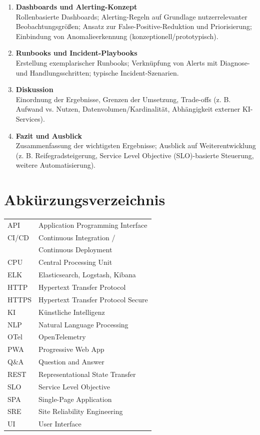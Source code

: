 \begin{enumerate}
  \item \textbf{Dashboards und Alerting-Konzept} \\
  Rollenbasierte Dashboards; Alerting-Regeln auf Grundlage nutzerrelevanter Beobachtungsgrößen; Ansatz zur False-Positive-Reduktion und Priorisierung; Einbindung von Anomalieerkennung (konzeptionell/prototypisch).

  \item \textbf{Runbooks und Incident-Playbooks} \\
  Erstellung exemplarischer Runbooks; Verknüpfung von Alerts mit Diagnose- und Handlungsschritten; typische Incident-Szenarien.

  \item \textbf{Diskussion} \\
  Einordnung der Ergebnisse, Grenzen der Umsetzung, Trade-offs (z. B.  Aufwand vs. Nutzen, Datenvolumen/Kardinalität, Abhängigkeit externer KI-Services).

  \item \textbf{Fazit und Ausblick} \\
  Zusammenfassung der wichtigsten Ergebnisse; Ausblick auf Weiterentwicklung (z. B.  Reifegradsteigerung, Service Level Objective (SLO)-basierte Steuerung, weitere Automatisierung).
\end{enumerate}



\section*{Abkürzungsverzeichnis}

\begin{tabular}{p{1.5cm} p{11cm}}
API        & Application Programming Interface \\
CI/CD      & Continuous Integration /\\
           & Continuous Deployment \\
CPU        & Central Processing Unit \\
ELK        & Elasticsearch, Logstash, Kibana \\
HTTP       & Hypertext Transfer Protocol \\
HTTPS     & Hypertext Transfer Protocol Secure \\
KI         & Künstliche Intelligenz \\
NLP        & Natural Language Processing \\
OTel      & OpenTelemetry \\
PWA       & Progressive Web App \\
Q\&A      & Question and Answer \\
REST      & Representational State Transfer \\
SLO       & Service Level Objective \\
SPA       & Single-Page Application \\
SRE       & Site Reliability Engineering \\
UI        & User Interface \\
\end{tabular}

